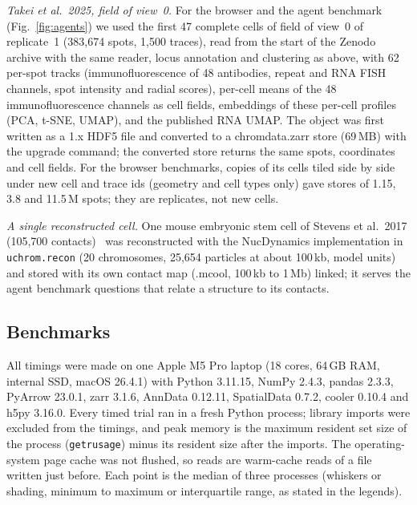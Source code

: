 \documentclass[11pt]{article}
\newcommand{\pkg}[1]{\texttt{#1}}
\begin{document}
\textit{Takei et al.\ 2025, field of view~0.}
For the browser and the agent benchmark (Fig.~\ref{fig:agents}) we used the first 47 complete cells of field of view~0 of replicate~1 (383,674 spots, 1,500 traces), read from the start of the Zenodo archive with the same reader, locus annotation and clustering as above, with 62 per-spot tracks (immunofluorescence of 48 antibodies, repeat and RNA FISH channels, spot intensity and radial scores), per-cell means of the 48 immunofluorescence channels as cell fields, embeddings of these per-cell profiles (PCA, t-SNE, UMAP), and the published RNA UMAP.
The object was first written as a 1.x HDF5 file and converted to a chromdata.zarr store (69\,MB) with the upgrade command; the converted store returns the same spots, coordinates and cell fields.
For the browser benchmarks, copies of its cells tiled side by side under new cell and trace ids (geometry and cell types only) gave stores of 1.15, 3.8 and 11.5\,M spots; they are replicates, not new cells.

\textit{A single reconstructed cell.}
One mouse embryonic stem cell of Stevens et al.\ 2017 (105,700 contacts)~\citep{stevens2017} was reconstructed with the NucDynamics implementation in \pkg{uchrom.recon} (20 chromosomes, 25,654 particles at about 100\,kb, model units) and stored with its own contact map (.mcool, 100\,kb to 1\,Mb) linked; it serves the agent benchmark questions that relate a structure to its contacts.

\subsection*{Benchmarks}
All timings were made on one Apple M5 Pro laptop (18 cores, 64\,GB RAM, internal SSD, macOS 26.4.1) with Python 3.11.15, NumPy 2.4.3, pandas 2.3.3, PyArrow 23.0.1, zarr 3.1.6, AnnData 0.12.11, SpatialData 0.7.2, cooler 0.10.4 and h5py 3.16.0.
Every timed trial ran in a fresh Python process; library imports were excluded from the timings, and peak memory is the maximum resident set size of the process (\pkg{getrusage}) minus its resident size after the imports.
The operating-system page cache was not flushed, so reads are warm-cache reads of a file written just before.
Each point is the median of three processes (whiskers or shading, minimum to maximum or interquartile range, as stated in the legends).
\end{document}
